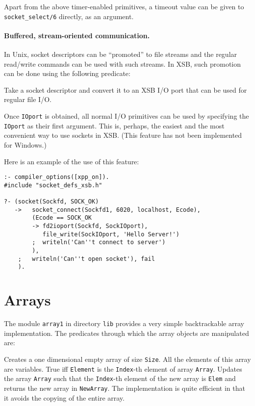 \noindent
Apart from the above timer-enabled primitives, a timeout value can be given
to {\tt socket\_select/6} directly, as an argument.


\paragraph{Buffered, stream-oriented communication.}
In Unix, socket descriptors can be ``promoted'' to file streams and the
regular read/write commands can be used with such streams. In XSB, such
promotion can be done using the following predicate:
\begin{description}
    Take a socket descriptor and convert it to an XSB I/O port that can be used
    for regular file I/O. 
\end{description}
Once {\tt IOport} is obtained, all normal I/O primitives can be used by
specifying the {\tt IOport} as their first argument. This is, perhaps, the
easiest and the most convenient way to use sockets in XSB. (This feature
has not been implemented for Windows.)

\noindent
Here is an example of the use of this feature:
\begin{samepage}
\begin{verbatim}
:- compiler_options([xpp_on]).
#include "socket_defs_xsb.h"

?- (socket(Sockfd, SOCK_OK)
   ->   socket_connect(Sockfd1, 6020, localhost, Ecode),
        (Ecode == SOCK_OK
        -> fd2ioport(Sockfd, SockIOport),
           file_write(SockIOport, 'Hello Server!')
        ;  writeln('Can''t connect to server')
        ),
    ;   writeln('Can''t open socket'), fail
    ).
\end{verbatim}
\end{samepage}


\section{Arrays}

The module {\tt array1} in directory {\tt lib} provides a very simple 
backtrackable array implementation.  The predicates through which the 
array objects are manipulated are:

\begin{description}
    Creates a one dimensional empty array of size {\tt Size}.  All the 
    elements of this array are variables.
    True iff {\tt Element} is the {\tt Index}-th element of array 
    {\tt Array}.
    Updates the array {\tt Array} such that the {\tt Index}-th element
    of the new array is {\tt Elem} and returns the new array in 
    {\tt NewArray}.  The implementation is quite efficient in that it 
    avoids the copying of the entire array.
\end{description}

